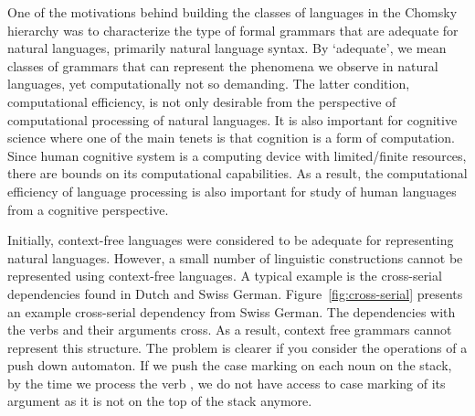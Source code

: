 One of the motivations behind building the classes of languages
in the Chomsky hierarchy was to characterize
the type of formal grammars that are adequate for natural languages,
primarily natural language syntax.
By `adequate', we mean classes of grammars that can represent
the phenomena we observe in natural languages,
yet computationally not so demanding.
The latter condition, computational efficiency,
is not only desirable
from the perspective of computational processing of natural languages.
It is also important for cognitive science
where one of the main tenets is that cognition is a form of computation.
Since human cognitive system is a computing device
with limited/finite resources,
there are bounds on its computational capabilities.
As a result, the computational efficiency of language processing is
also important for study of human languages from a cognitive perspective.


Initially,
context-free languages were considered to be adequate
for representing natural languages.
However,
a small number of linguistic constructions cannot be represented
using context-free languages.
A typical example is the cross-serial dependencies found
in Dutch and Swiss German.
Figure~\ref{fig:cross-serial} presents
an example cross-serial dependency from Swiss German.
The dependencies with the verbs and their arguments cross.
As a result, context free grammars cannot represent this structure.
The problem is clearer if you consider
the operations of a push down automaton.
If we push the case marking on each noun on the stack,
by the time we process the verb ,
we do not have access to case marking of its argument
as it is not on the top of the stack anymore.

\begin{figure*}
  \tikzset{external/export next=false}
  \begin{center}
  \end{center}
  \caption{
    An example cross-serial dependency from Swiss German
    \parencite{shieber1985}.
    The case marking of  agrees with the verb
    ,
    while the case marking of  agrees with the verb
    .
    Note that this resembles 
    $a^{\color{blue}n}b^{\color{red}m}c^{\color{blue}n}d^{\color{red}m}$.
  }\label{fig:cross-serial}%
\end{figure*}

